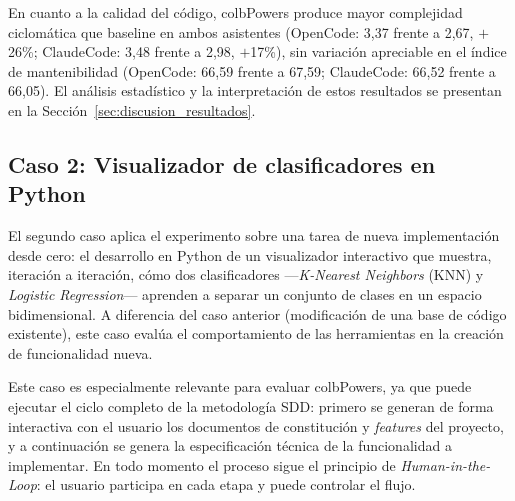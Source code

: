\documentclass[11pt, letterpaper]{article}
\begin{document}
En cuanto a la calidad del código, colbPowers produce mayor complejidad ciclomática que baseline en ambos asistentes (OpenCode: 3,37 frente a 2,67, $+$26\%; ClaudeCode: 3,48 frente a 2,98, $+$17\%), sin variación apreciable en el índice de mantenibilidad (OpenCode: 66,59 frente a 67,59; ClaudeCode: 66,52 frente a 66,05). El análisis estadístico y la interpretación de estos resultados se presentan en la Sección~\ref{sec:discusion_resultados}.

\subsection{Caso 2: Visualizador de clasificadores en Python}
\label{sec:caso2_simulacion3d}
El segundo caso aplica el experimento sobre una tarea de nueva implementación desde cero: el desarrollo en Python de un visualizador interactivo que muestra, iteración a iteración, cómo dos clasificadores ---\textit{K-Nearest Neighbors} (KNN) y \textit{Logistic Regression}--- aprenden a separar un conjunto de clases en un espacio bidimensional. A diferencia del caso anterior (modificación de una base de código existente), este caso evalúa el comportamiento de las herramientas en la creación de funcionalidad nueva.

Este caso es especialmente relevante para evaluar colbPowers, ya que puede ejecutar el ciclo completo de la metodología SDD: primero se generan de forma interactiva con el usuario los documentos de constitución y \textit{features} del proyecto, y a continuación se genera la especificación técnica de la funcionalidad a implementar. En todo momento el proceso sigue el principio de \textit{Human-in-the-Loop}: el usuario participa en cada etapa y puede controlar el flujo.
\end{document}

